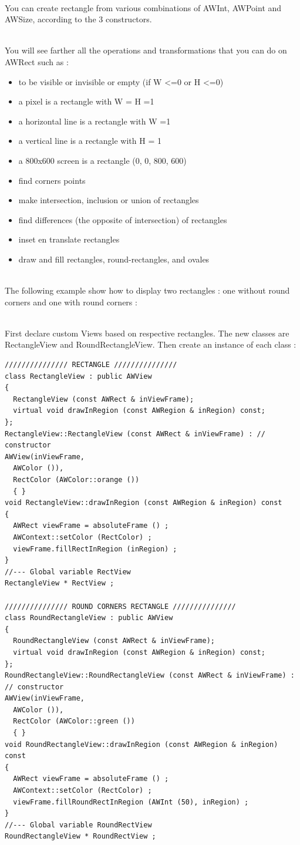 \documentclass[a4paper,11pt]{extarticle}
\begin{document}
~\\ You can create rectangle from various combinations of AWInt, AWPoint and AWSize, according to the 3 constructors. 

~\\ You will see farther all the operations and transformations that you can do on AWRect such as :
\begin{itemize}
\item to be visible or invisible or empty (if W <=0 or H <=0)
\item a pixel is a rectangle with W = H =1
\item a horizontal line is a rectangle with W =1
\item a vertical line is a rectangle with H = 1
\item a 800x600 screen is a rectangle (0, 0, 800, 600)
\item find corners points
\item make intersection, inclusion or union of rectangles
\item find differences (the opposite of intersection) of rectangles
\item inset en translate rectangles
\item draw and fill rectangles, round-rectangles, and ovales
\end{itemize}

~\\The following example show how to display two rectangles : one without round corners and one with round corners :

~\\ First declare custom Views based on respective rectangles. The new classes are RectangleView and RoundRectangleView. Then create an instance of each class :

\begin{lstlisting}[language=Arduinonl]
/////////////// RECTANGLE ///////////////
class RectangleView : public AWView
{
  RectangleView (const AWRect & inViewFrame);
  virtual void drawInRegion (const AWRegion & inRegion) const;
};
RectangleView::RectangleView (const AWRect & inViewFrame) : // constructor
AWView(inViewFrame, 
  AWColor ()),             
  RectColor (AWColor::orange ()) 
  { }
void RectangleView::drawInRegion (const AWRegion & inRegion) const
{
  AWRect viewFrame = absoluteFrame () ;
  AWContext::setColor (RectColor) ;
  viewFrame.fillRectInRegion (inRegion) ;
}
//--- Global variable RectView
RectangleView * RectView ;

/////////////// ROUND CORNERS RECTANGLE ///////////////
class RoundRectangleView : public AWView
{
  RoundRectangleView (const AWRect & inViewFrame);
  virtual void drawInRegion (const AWRegion & inRegion) const;
};
RoundRectangleView::RoundRectangleView (const AWRect & inViewFrame) : // constructor
AWView(inViewFrame, 
  AWColor ()),             
  RectColor (AWColor::green ()) 
  { }
void RoundRectangleView::drawInRegion (const AWRegion & inRegion) const
{
  AWRect viewFrame = absoluteFrame () ;
  AWContext::setColor (RectColor) ;
  viewFrame.fillRoundRectInRegion (AWInt (50), inRegion) ;
}
//--- Global variable RoundRectView
RoundRectangleView * RoundRectView ;
\end{lstlisting}
\end{document}
